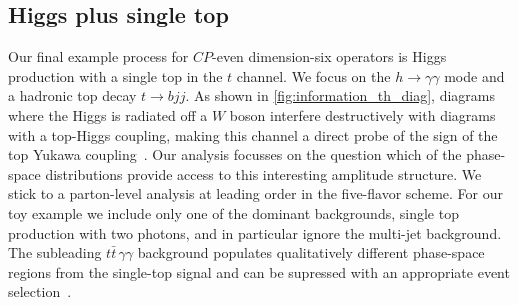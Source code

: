 \subsection{Higgs plus single top}
\label{sec:information_th}

Our final example process for $CP$-even dimension-six operators is
Higgs production with a single top in the $t$ channel. We focus on the
$h \to \gamma \gamma$ mode and a hadronic top decay $t \to b jj$. As
shown in \autoref{fig:information_th_diag}, diagrams where the Higgs
is radiated off a $W$ boson interfere destructively with diagrams with
a top-Higgs coupling, making this channel a direct probe of the sign
of the top Yukawa coupling~\cite{Maltoni:2001hu}. Our analysis
focusses on the question which of the phase-space distributions
provide access to this interesting amplitude structure. We stick to a
parton-level analysis at leading order in the five-flavor scheme. For
our toy example we include only one of the dominant backgrounds,
single top production with two photons, and in particular ignore the
multi-jet background. The subleading $t\bar{t} \, \gamma\gamma$
background populates qualitatively different phase-space regions from
the single-top signal and can be supressed with an appropriate event
selection~\cite{Kling:2012up}.

